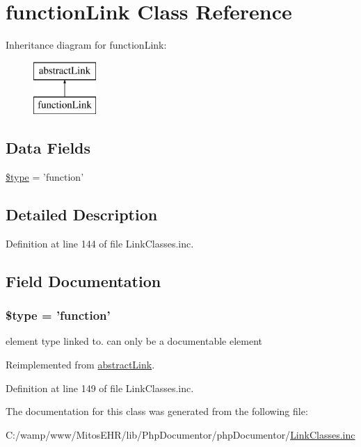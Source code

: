 \hypertarget{classfunction_link}{\section{function\-Link \-Class \-Reference}
\label{classfunction_link}
}
\-Inheritance diagram for function\-Link\-:\begin{figure}[H]
\begin{center}
\leavevmode
\includegraphics[height=2.000000cm]{classfunction_link}
\end{center}
\end{figure}
\subsection*{\-Data \-Fields}
\begin{DoxyCompactItemize}
\item 
\hyperlink{classfunction_link_a9a4a6fba2208984cabb3afacadf33919}{\$type} = 'function'
\end{DoxyCompactItemize}


\subsection{\-Detailed \-Description}


\-Definition at line 144 of file \-Link\-Classes.\-inc.



\subsection{\-Field \-Documentation}
\hypertarget{classfunction_link_a9a4a6fba2208984cabb3afacadf33919}{
\subsubsection[{\$type}]{\setlength{\rightskip}{0pt plus 5cm}\$type = 'function'}}\label{classfunction_link_a9a4a6fba2208984cabb3afacadf33919}
element type linked to. can only be a documentable element 

\-Reimplemented from \hyperlink{classabstract_link_a9a4a6fba2208984cabb3afacadf33919}{abstract\-Link}.



\-Definition at line 149 of file \-Link\-Classes.\-inc.



\-The documentation for this class was generated from the following file\-:\begin{DoxyCompactItemize}
\item 
\-C\-:/wamp/www/\-Mitos\-E\-H\-R/lib/\-Php\-Documentor/php\-Documentor/\hyperlink{_link_classes_8inc}{\-Link\-Classes.\-inc}\end{DoxyCompactItemize}
